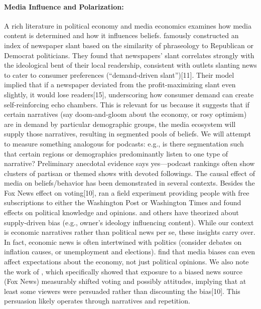 \documentclass[12pt]{article}
\begin{document}
\paragraph{Media Influence and Polarization:} A rich literature in political economy and media economics examines how media content is determined and how it influences beliefs. \citet{GentzkowShapiro2010} famously constructed an index of newspaper slant based on the similarity of phraseology to Republican or Democrat politicians. They found that newspapers' slant correlates strongly with the ideological bent of their local readership, consistent with outlets slanting news to cater to consumer preferences (``demand-driven slant'')[11]. Their model implied that if a newspaper deviated from the profit-maximizing slant even slightly, it would lose readers[15], underscoring how consumer demand can create self-reinforcing echo chambers. This is relevant for us because it suggests that if certain narratives (say doom-and-gloom about the economy, or rosy optimism) are in demand by particular demographic groups, the media ecosystem will supply those narratives, resulting in segmented pools of beliefs. We will attempt to measure something analogous for podcasts: e.g., is there segmentation such that certain regions or demographics predominantly listen to one type of narrative? Preliminary anecdotal evidence says yes—podcast rankings often show clusters of partisan or themed shows with devoted followings.
The causal effect of media on beliefs/behavior has been demonstrated in several contexts. Besides the Fox News effect on voting[10], \citet{GerberKarlanBergan2009} ran a field experiment providing people with free subscriptions to either the Washington Post or Washington Times and found effects on political knowledge and opinions. \citet{Baron2006} and others have theorized about supply-driven bias (e.g., owner's ideology influencing content). While our context is economic narratives rather than political news per se, these insights carry over. In fact, economic news is often intertwined with politics (consider debates on inflation causes, or unemployment and elections). \citet{ShapiroGentzkow2009} find that media biases can even affect expectations about the economy, not just political opinions. We also note the work of \citet{DellaVignaKaplan2007}, which specifically showed that exposure to a biased news source (Fox News) measurably shifted voting and possibly attitudes, implying that at least some viewers were persuaded rather than discounting the bias[10]. This persuasion likely operates through narratives and repetition.
\end{document}
